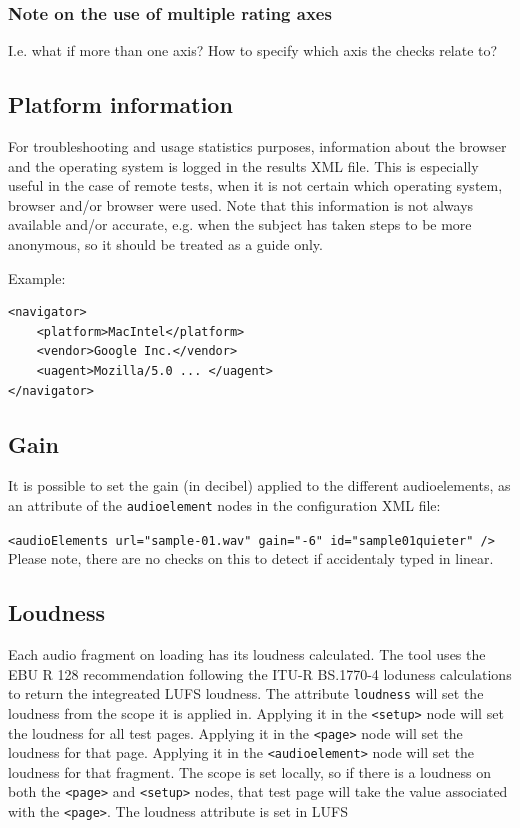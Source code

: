 \documentclass[11pt, oneside]{article}   	%
\begin{document}
		\subsubsection{Note on the use of multiple rating axes}
			I.e. what if more than one axis? How to specify which axis the checks relate to? %

	\subsection{Platform information}
		For troubleshooting and usage statistics purposes, information about the browser and the operating system is logged in the results XML file. This is especially useful in the case of remote tests, when it is not certain which operating system, browser and/or browser were used. Note that this information is not always available and/or accurate, e.g. when the subject has taken steps to be more anonymous, so it should be treated as a guide only.

		Example: 
		\begin{lstlisting}
<navigator>
	<platform>MacIntel</platform>
	<vendor>Google Inc.</vendor>
	<uagent>Mozilla/5.0 ... </uagent>
</navigator>
		\end{lstlisting}

	\subsection{Gain}
		It is possible to set the gain (in decibel) applied to the different audioelements, as an attribute of the \texttt{audioelement} nodes in the configuration XML file: 

		\texttt{<audioElements url="sample-01.wav" gain="-6" id="sample01quieter" />}\\
		Please note, there are no checks on this to detect if accidentaly typed in linear.

	\subsection{Loudness}
	\label{sec:loudness}
		Each audio fragment on loading has its loudness calculated. The tool uses the EBU R 128 recommendation following the ITU-R BS.1770-4 loduness calculations to return the integreated LUFS loudness. The attribute \texttt{loudness} will set the loudness from the scope it is applied in. Applying it in the \texttt{<setup>} node will set the loudness for all test pages. Applying it in the \texttt{<page>} node will set the loudness for that page. Applying it in the \texttt{<audioelement>} node will set the loudness for that fragment. The scope is set locally, so if there is a loudness on both the \texttt{<page>} and \texttt{<setup>} nodes, that test page will take the value associated with the \texttt{<page>}. The loudness attribute is set in LUFS
\end{document}
